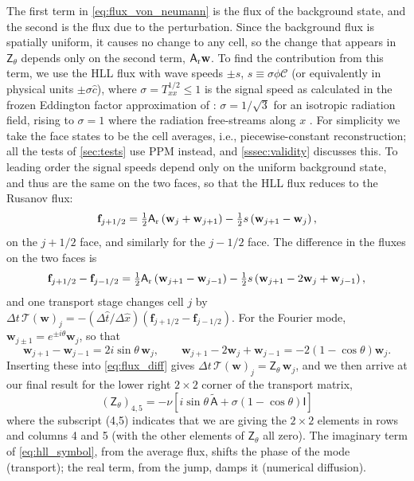 \documentclass[preprint,12pt,authoryear]{elsarticle}
\newcommand{\tenA}{\mathsf{A}}
\newcommand{\tenI}{\mathsf{I}}
\newcommand{\tenZ}{\mathsf{Z}}
\newcommand{\hatt}{\hat{t}}
\newcommand{\hx}{\hat{x}}
\newcommand{\calC}{\mathcal{C}}
\begin{document}
The first term in \autoref{eq:flux_von_neumann} is the flux of the background state, and the second is the flux due to the perturbation. Since the background flux is spatially uniform, it causes no change to any cell, so the change that appears in $\tenZ_\theta$ depends only on the second term, $\tenA_{\rm r}\mathbf{w}$. To find the contribution from this term, we use the HLL flux \citep{Toro09a} with wave speeds $\pm s$, $s \equiv \sigma\phi\calC$ (or equivalently in physical units $\pm\sigma\hat{c}$), where $\sigma = T_{xx}^{1/2} \leq 1$ is the signal speed as calculated in the frozen Eddington factor approximation of \citet{Balsara_1999}: $\sigma = 1/\sqrt{3}$ for an isotropic radiation field, rising to $\sigma = 1$ where the radiation free-streams along $x$ \citep{Levermore84a}. For simplicity we take the face states to be the cell averages, i.e., piecewise-constant reconstruction; all the tests of \autoref{sec:tests} use PPM instead, and \autoref{sssec:validity} discusses this. To leading order the signal speeds depend only on the uniform background state, and thus are the same on the two faces, so that the HLL flux reduces to the Rusanov flux:
\begin{equation}
    \mathbf{f}_{j+1/2} = \tfrac{1}{2}\tenA_{\rm r}\left(\mathbf{w}_j + \mathbf{w}_{j+1}\right) - \tfrac{1}{2}s\left(\mathbf{w}_{j+1} - \mathbf{w}_j\right),
    \label{eq:rusanov}
\end{equation}
on the $j+1/2$ face, and similarly for the $j-1/2$ face. The difference in the fluxes on the two faces is
\begin{equation}
    \mathbf{f}_{j+1/2} - \mathbf{f}_{j-1/2} = \tfrac{1}{2}\tenA_{\rm r}\left(\mathbf{w}_{j+1} - \mathbf{w}_{j-1}\right) - \tfrac{1}{2}s\left(\mathbf{w}_{j+1} - 2\mathbf{w}_j + \mathbf{w}_{j-1}\right),
    \label{eq:flux_diff}
\end{equation}
and one transport stage changes cell $j$ by $\Delta t\,\mathcal{T}(\mathbf{w})_j = -(\Delta\hatt/\Delta\hx)(\mathbf{f}_{j+1/2} - \mathbf{f}_{j-1/2})$. For the Fourier mode, $\mathbf{w}_{j\pm1} = e^{\pm i\theta}\mathbf{w}_j$, so that
\begin{equation}
    \mathbf{w}_{j+1} - \mathbf{w}_{j-1} = 2i\sin\theta\,\mathbf{w}_j,
    \qquad
    \mathbf{w}_{j+1} - 2\mathbf{w}_j + \mathbf{w}_{j-1} = -2\left(1 - \cos\theta\right)\mathbf{w}_j .
    \label{eq:fourier_diff}
\end{equation}
Inserting these into \autoref{eq:flux_diff} gives $\Delta t\,\mathcal{T}(\mathbf{w})_j = \tenZ_\theta\,\mathbf{w}_j$, and we then arrive at our final result for the lower right $2\times 2$ corner of the transport matrix,
\begin{equation}
    (\tenZ_\theta)_{4,5}= -\nu\left[i\sin\theta\,\tilde{\tenA} + \sigma\left(1-\cos\theta\right)\tenI\right]
    \label{eq:hll_symbol}
\end{equation}
where the subscript (4,5) indicates that we are giving the $2\times 2$ elements in rows and columns 4 and 5 (with the other elements of $\tenZ_\theta$ all zero).
The imaginary term of \autoref{eq:hll_symbol}, from the average flux, shifts the phase of the mode (transport); the real term, from the jump, damps it (numerical diffusion).
\end{document}

